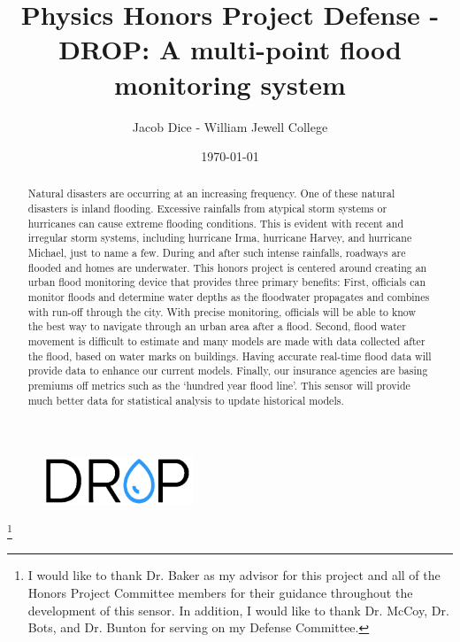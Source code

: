 \documentclass[letter]{article}
\newcommand\blfootnote[1]{%
	\begingroup
	\renewcommand\thefootnote{}\footnote{#1}%
	\addtocounter{footnote}{-1}%
	\endgroup
}
\begin{document}
\begin{figure}[t]
\centering
\includegraphics[width=0.4\textwidth]{img/dropLogo.png}
\end{figure}
\title{Physics Honors Project Defense - DROP: A multi-point flood monitoring system}

\author{Jacob Dice - William Jewell College}


\date{\today}
\maketitle



\begin{abstract}

Natural disasters are occurring at an increasing frequency. One of these natural disasters is inland flooding. Excessive rainfalls from atypical storm systems or hurricanes can cause extreme flooding conditions. This is evident with recent and irregular storm systems, including hurricane Irma, hurricane Harvey, and hurricane Michael, just to name a few. During and after such intense rainfalls, roadways are flooded and homes are underwater. This honors project is centered around creating an urban flood monitoring device that provides three primary benefits: First, officials can monitor floods and determine water depths as the floodwater propagates and combines with run-off through the city. With precise monitoring, officials will be able to know the best way to navigate through an urban area after a flood. Second, flood water movement is difficult to estimate and many models are made with data collected after the flood, based on water marks on buildings. Having accurate real-time flood data will provide data to enhance our current models. Finally, our insurance agencies are basing premiums off metrics such as the `hundred year flood line'. This sensor will provide much better data for statistical analysis to update historical models.  
\end{abstract}
\blfootnote{I would like to thank Dr. Baker as my advisor for this project and all of the Honors Project Committee members for their guidance throughout the development of this sensor. In addition, I would like to thank Dr. McCoy, Dr. Bots, and Dr. Bunton for serving on my Defense Committee.}
\end{document}
